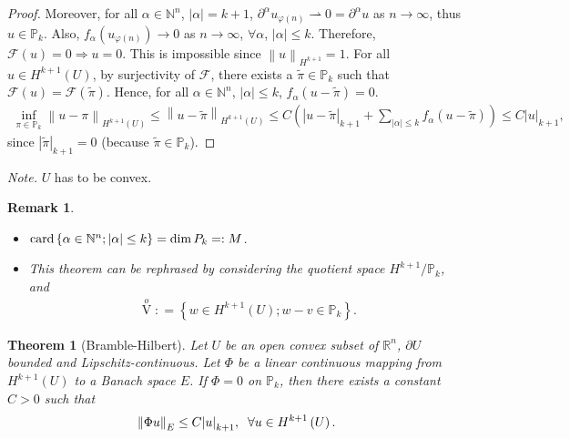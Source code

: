 \documentclass[11pt,a4paper,center,notitlepage]{article}
\numberwithin{equation}{section}
\newtheorem{theorem}{Theorem}[section]
\newtheorem{remark}{Remark}[section]
\begin{document}
\begin{proof}
Moreover, for all $\alpha \in \mathbb{N}^n$, $\left| \alpha  \right| = k + 1$, $\partial ^\alpha u_{\varphi \left(n\right)} \rightharpoonup 0 = \partial ^\alpha  u$ as $n\to \infty$, thus $u\in \mathbb{P}_k$. Also, ${f_\alpha }\left( {{u_{\varphi \left( n \right)}}} \right) \to 0$ as $n \to \infty$, $\forall \alpha$, $\left| \alpha  \right| \le k$. Therefore, $\mathcal{F} \left(u\right)=0 \Rightarrow u=0$. This is impossible since ${\left\| u \right\|_{{H^{k + 1}}}} = 1$. For all $u\in H^{k+1}\left(U\right)$, by surjectivity of $\mathcal{F}$, there exists a $\widetilde \pi \in \mathbb{P}_k$ such that $\mathcal{F}\left(u\right) =\mathcal{F}\left(\widetilde \pi\right)$. Hence, for all $\alpha \in \mathbb{N}^n$, $\left| \alpha  \right| \le k$, $f_\alpha \left(u-\widetilde \pi\right) =0$.
\begin{align}
\mathop {\inf }\limits_{\pi  \in {\mathbb{P}_k}} {\left\| {u - \pi } \right\|_{{H^{k + 1}}\left( U \right)}} \le {\left\| {u - \widetilde \pi } \right\|_{{H^{k + 1}}\left( U \right)}} \le C\left( {{{\left| {u - \widetilde \pi } \right|}_{k + 1}} + \sum\limits_{\left| \alpha  \right| \le k} {{f_\alpha }\left( {u - \widetilde \pi } \right)} } \right) \le C{\left| u \right|_{k + 1}},
\end{align}
since ${\left| {\widetilde \pi } \right|_{k + 1}} = 0$ (because $\widetilde \pi \in \mathbb{P}_k$).
\end{proof}
\noindent
\textit{Note.} $U$ has to be convex. 
\begin{remark}
\begin{itemize}
\item ${\rm card }\left\{ {\alpha  \in {\mathbb{N}^n};\left| \alpha  \right| \le k} \right\} = \dim {P_k} = :M$.
\item This theorem can be rephrased by considering the quotient space $H^{k+1}/\mathbb{P}_k$, and
\begin{align}
\mathop V\limits^o : = \left\{ {w \in {H^{k + 1}}\left( U \right);w - v \in {\mathbb{P}_k}} \right\}.
\end{align}
\end{itemize}
\end{remark}

\begin{theorem}[Bramble-Hilbert]
Let $U$ be an open convex subset of $\mathbb{R}^n$, $\partial U$ bounded and Lipschitz-continuous. Let $\Phi$ be a linear continuous mapping from $H^{k+1}\left(U\right)$ to a Banach space $E$. If $\Phi =0$ on $\mathbb{P}_k$, then there exists a constant $C>0$ such that 
\begin{align}
{\left\| {\Phi u} \right\|_E} \le C{\left| u \right|_{k + 1}},\hspace{2mm}\forall u \in {H^{k + 1}}\left( U \right).
\end{align}
\end{theorem}
\end{document}
